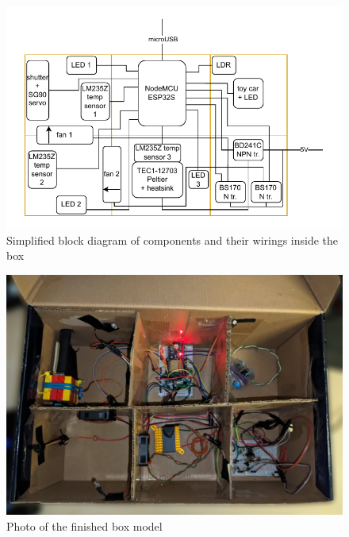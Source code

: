 \begin{figure}[!ht]
    \centering
    \includegraphics[page=1,keepaspectratio,width=150mm]{figures/box_block_diag.drawio.pdf}
    \caption{Simplified block diagram of components and their wirings inside the box}
    \label{fig:BoxBlockDiag}
\end{figure}

\begin{figure}[!ht]
    \centering
    \includegraphics[width=150mm, keepaspectratio]{figures/box_photo.jpg}
    \caption{Photo of the finished box model}
    \label{fig:BoxPhoto}
\end{figure}

